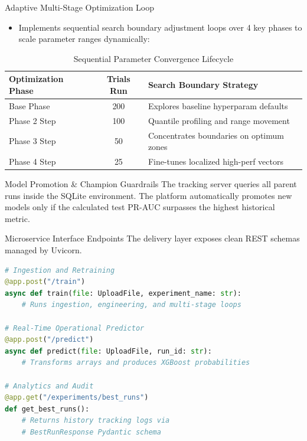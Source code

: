\begin{frame}{Adaptive Multi-Stage Optimization Loop}
    \begin{itemize}
        \item Implements sequential search boundary adjustment loops over 4 key phases to scale parameter ranges dynamically:
    \end{itemize}
    \begin{table}\scriptsize
        \centering
        \begin{tabular}{lcl}
            \toprule
            \textbf{Optimization Phase} & \textbf{Trials Run} & \textbf{Search Boundary Strategy} \\
            \midrule
            Base Phase & 200 & Explores baseline hyperparam defaults \\
            Phase 2 Step & 100 & Quantile profiling and range movement \\
            Phase 3 Step & 50 & Concentrates boundaries on optimum zones \\
            Phase 4 Step & 25 & Fine-tunes localized high-perf vectors \\
            \bottomrule
        \end{tabular}
        \caption{Sequential Parameter Convergence Lifecycle}
    \end{table}
    \begin{block}{Model Promotion \& Champion Guardrails}
        The tracking server queries all parent runs inside the SQLite environment. The platform automatically promotes new models only if the calculated test PR-AUC surpasses the highest historical metric.
    \end{block}
\end{frame}

\begin{frame}[fragile]{Microservice Interface Endpoints}
    The delivery layer exposes clean REST schemas managed by Uvicorn.
    \scriptsize
    \begin{lstlisting}[language=Python]
# Ingestion and Retraining 
@app.post("/train")
async def train(file: UploadFile, experiment_name: str):
    # Runs ingestion, engineering, and multi-stage loops

# Real-Time Operational Predictor
@app.post("/predict")
async def predict(file: UploadFile, run_id: str):
    # Transforms arrays and produces XGBoost probabilities

# Analytics and Audit
@app.get("/experiments/best_runs")
def get_best_runs():
    # Returns history tracking logs via 
    # BestRunResponse Pydantic schema
    \end{lstlisting}
\end{frame}

